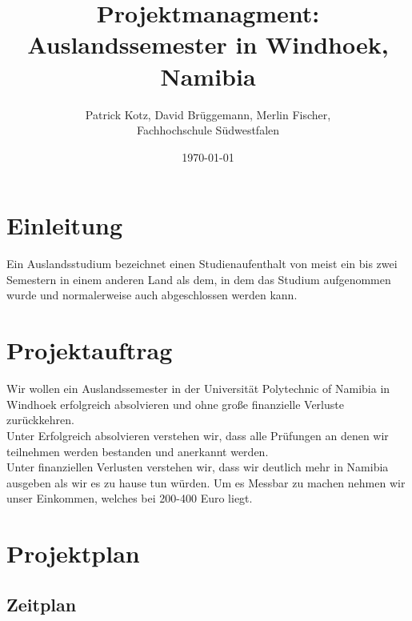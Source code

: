 \documentclass[11pt]{article}
\begin{document}
\begin{titlepage}
  \title{Projektmanagment: \\Auslandssemester in Windhoek, Namibia}
  \author{Patrick Kotz, David Brüggemann, Merlin Fischer,\\ Fachhochschule Südwestfalen}
  \date{\today}
\end{titlepage}

\fancyfoot[C]{\thepage}

\maketitle

\newpage
\tableofcontents
\newpage

\section{Einleitung}
Ein Auslandsstudium bezeichnet einen Studienaufenthalt von meist ein bis zwei Semestern in einem anderen Land als dem, in dem das Studium aufgenommen wurde und normalerweise auch abgeschlossen werden kann.

\section{Projektauftrag}
Wir wollen ein Auslandssemester in der Universität Polytechnic of Namibia in Windhoek erfolgreich absolvieren und ohne große finanzielle Verluste zurückkehren.\\

Unter Erfolgreich absolvieren verstehen wir, dass alle Prüfungen an denen wir teilnehmen werden bestanden und anerkannt werden.\\

Unter finanziellen Verlusten verstehen wir, dass wir deutlich mehr in Namibia ausgeben als wir es zu hause tun würden. Um es Messbar zu machen nehmen wir unser Einkommen, welches bei 200-400 Euro liegt.

\newpage

\section{Projektplan}

\subsection{Zeitplan}
\end{document}
